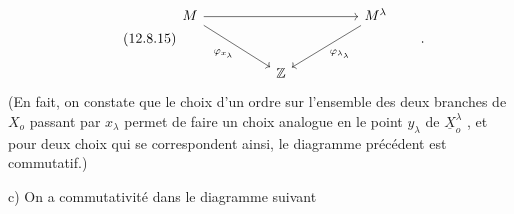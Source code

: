 \begin{equation}\tag{12.8.15}
\begin{tikzcd}[column sep=huge, row sep=large]
M \arrow[rr] \arrow[dr, "\varphi_{x_{\lambda}}"'] & & M^{\lambda} \arrow[dl, "\varphi_{\lambda_{\lambda}}"] \\
 & \mathbb{Z} &
\end{tikzcd} \qquad .
\end{equation}
(En fait, on constate que le choix d'un ordre sur l'ensemble des deux branches de $X_{o}$ passant par $x_{\lambda}$ permet de faire un choix analogue en le point $y_{\lambda}$ de $\underline{X}^{\lambda}_{o}$ , et pour deux choix qui se correspondent ainsi, le diagramme précédent est commutatif.)

c)  On a commutativité dans le diagramme suivant

